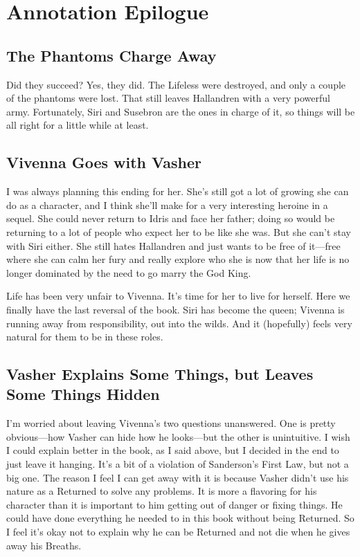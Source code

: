 \section{Annotation Epilogue}

\subsection*{The Phantoms Charge Away}

Did they succeed? Yes, they did. The Lifeless were destroyed, and only a couple of the phantoms were lost. That still leaves Hallandren with a very powerful army. Fortunately, Siri and Susebron are the ones in charge of it, so things will be all right for a little while at least.

\subsection*{Vivenna Goes with Vasher}

I was always planning this ending for her. She’s still got a lot of growing she can do as a character, and I think she’ll make for a very interesting heroine in a sequel. She could never return to Idris and face her father; doing so would be returning to a lot of people who expect her to be like she was. But she can’t stay with Siri either. She still hates Hallandren and just wants to be free of it—free where she can calm her fury and really explore who she is now that her life is no longer dominated by the need to go marry the God King.

Life has been very unfair to Vivenna. It’s time for her to live for herself. Here we finally have the last reversal of the book. Siri has become the queen; Vivenna is running away from responsibility, out into the wilds. And it (hopefully) feels very natural for them to be in these roles.

\subsection*{Vasher Explains Some Things, but Leaves Some Things Hidden}

I’m worried about leaving Vivenna’s two questions unanswered. One is pretty obvious—how Vasher can hide how he looks—but the other is unintuitive. I wish I could explain better in the book, as I said above, but I decided in the end to just leave it hanging. It’s a bit of a violation of Sanderson’s First Law, but not a big one. The reason I feel I can get away with it is because Vasher didn’t use his nature as a Returned to solve any problems. It is more a flavoring for his character than it is important to him getting out of danger or fixing things. He could have done everything he needed to in this book without being Returned. So I feel it’s okay not to explain why he can be Returned and not die when he gives away his Breaths.

